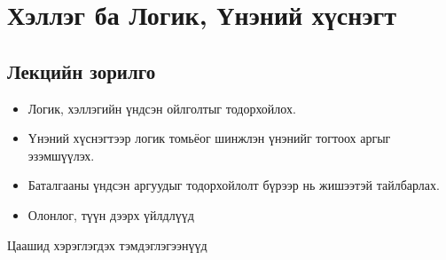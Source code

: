 \chapter{Хэллэг ба Логик, Үнэний хүснэгт}
\section*{Лекцийн зорилго}
\begin{itemize}
  \item Логик, хэллэгийн үндсэн ойлголтыг тодорхойлох.
  \item Үнэний хүснэгтээр логик томьёог шинжлэн үнэнийг тогтоох аргыг эзэмшүүлэх.
  \item Баталгааны үндсэн аргуудыг тодорхойлолт бүрээр нь жишээтэй тайлбарлах.
  \item Олонлог, түүн дээрх үйлдлүүд
\end{itemize}
Цаашид хэрэглэгдэх тэмдэглэгээнүүд\\
